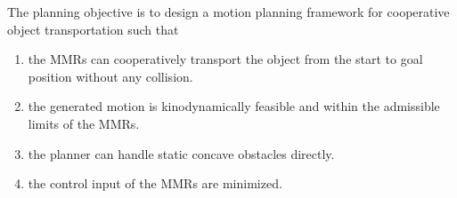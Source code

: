 The planning objective is to design a motion planning framework for cooperative object transportation such that
\begin{enumerate}
	\item the MMRs can cooperatively transport the object from the start to goal position without any collision.
	\item the generated motion is kinodynamically feasible and within the admissible limits of the MMRs. 
	\item the planner can handle static concave obstacles directly.
	\item the control input of the MMRs are minimized.
\end{enumerate}